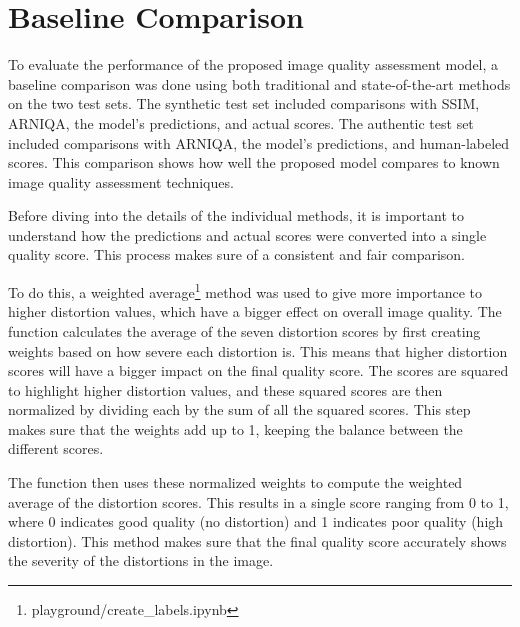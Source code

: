 \section{Baseline Comparison}
\label{sec:Baseline}
To evaluate the performance of the proposed image quality assessment model, a baseline comparison was done using both traditional and state-of-the-art methods on the two test sets. The synthetic test set included comparisons with SSIM, ARNIQA, the model’s predictions, and actual scores. The authentic test set included comparisons with ARNIQA, the model’s predictions, and human-labeled scores. This comparison shows how well the proposed model compares to known image quality assessment techniques. \par
\vspace{\baselineskip}
\noindent
Before diving into the details of the individual methods, it is important to understand how the predictions and actual scores were converted into a single quality score. This process makes sure of a consistent and fair comparison. \par
\vspace{\baselineskip}
\noindent
To do this, a weighted average\footnote{playground/create\_labels.ipynb} method was used to give more importance to higher distortion values, which have a bigger effect on overall image quality. The function calculates the average of the seven distortion scores by first creating weights based on how severe each distortion is. This means that higher distortion scores will have a bigger impact on the final quality score. The scores are squared to highlight higher distortion values, and these squared scores are then normalized by dividing each by the sum of all the squared scores. This step makes sure that the weights add up to 1, keeping the balance between the different scores. \par
\vspace{\baselineskip}
\noindent
The function then uses these normalized weights to compute the weighted average of the distortion scores. This results in a single score ranging from 0 to 1, where 0 indicates good quality (no distortion) and 1 indicates poor quality (high distortion). This method makes sure that the final quality score accurately shows the severity of the distortions in the image. \par

